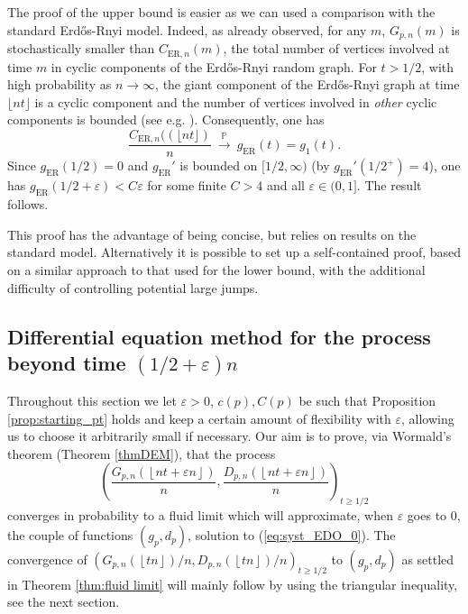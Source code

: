 \documentclass[a4, 11pt]{article}
\numberwithin{equation}{section}
\theoremstyle{plain}
\theoremstyle{definition}
\theoremstyle{remark}
\begin{document}
The proof of the upper bound is easier as we can used a comparison with the standard Erd\H{o}s-Rnyi model. Indeed, as already observed, for any $m$, $G_{p,n}(m)$ is stochastically smaller than $C_{\mathrm{ER},n}(m)$, the total number of vertices  involved at time $m$ in cyclic components of the Erd\H{o}s-Rnyi random graph. For $t>1/2$, with high probability as $n \rightarrow \infty$,  the giant component of the Erd\H{o}s-Rnyi graph at time $\lfloor nt\rfloor$ is a cyclic component and the number of vertices involved in \emph{other} cyclic components is bounded (see e.g. \cite[Theorem 6.11]{bollobas01}). Consequently, one has \begin{equation*}
	\frac{C_{\mathrm{ER},n}(\left(\lfloor nt\rfloor\right)}{n}~\overset{\mathbb{P}}\longrightarrow~g_{\mathrm{ER}}(t)=g_1(t).
\end{equation*}
Since $g_{\mathrm{ER}}(1/2)=0$ and $g_{\mathrm{ER}}'$ is bounded on $[1/2,\infty)$ (by $g_{\mathrm{ER}}'(1/2^+)=4$), one has $g_{\mathrm{ER}}(1/2+\varepsilon) < C \varepsilon$ for some finite $C>4$ and all $\varepsilon \in (0,1]$. The result follows.

This proof has the advantage of being concise, but relies on results on the standard model. Alternatively it is possible to set up a self-contained proof, based on a similar approach to that used for the lower bound, with the additional difficulty of controlling potential large jumps. 

\subsection{Differential equation method for the process beyond time $(1/2+\varepsilon)n$}
\label{sec:DEM_eps}
		
Throughout this section we let $\varepsilon>0$, $c(p),C(p)$ be such that Proposition \ref{prop:starting_pt} holds and keep a certain amount of flexibility with $\varepsilon$, allowing us to choose it arbitrarily small if necessary. Our aim is to prove, via Wormald's theorem  (Theorem \ref{thmDEM}), that the process $$ \left(\frac{G_{p,n}\left(\left\lfloor nt+\varepsilon n\right\rfloor\right)}{n},\frac{D_{p,n}\left(\left\lfloor nt+\varepsilon n\right\rfloor\right)}{n}\right)_{t\geq 1/2}$$ converges in probability to a fluid limit which will approximate, when $\varepsilon$ goes to $0$, the couple of functions $(g_p,d_p)$, solution to (\ref{eq:syst_EDO_0}).  The convergence of  $ \left(G_{p,n}\left(\left\lfloor t n\right\rfloor\right)/n,D_{p,n}\left(\left\lfloor t n\right\rfloor\right)/n\right)_{t\geq 1/2}$ to $(g_p,d_p)$ as settled in Theorem \ref{thm:fluid limit} will mainly follow by using the triangular inequality, see the next section. 
\end{document}

